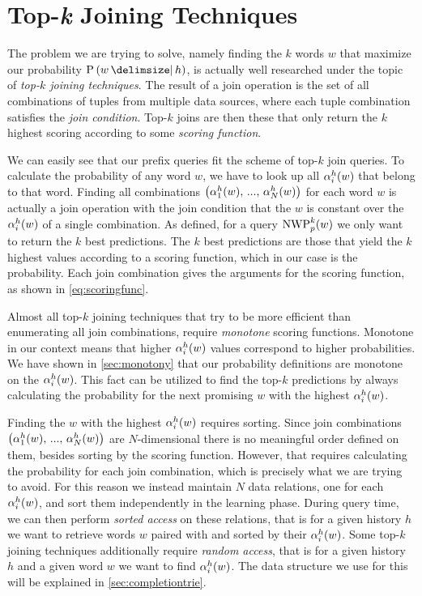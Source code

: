 \section{Top-\emph{k} Joining Techniques}
\label{sec:topkjoin}

The problem we are trying to solve, namely finding the $k$ words $w$ that
maximize our probability $\Prob{w}{h}$, is actually well researched under the
topic of \emph{top-$k$ joining techniques}.
The result of a join operation is the set of all combinations of tuples from
multiple data sources, where each tuple combination satisfies the \emph{join
condition}.
Top-$k$ joins are then these that only return the $k$ highest scoring
according to some \emph{scoring function}.

We can easily see that our prefix queries fit the scheme of top-$k$ join
queries.
To calculate the probability of any word $w$, we have to look up all
$\alpha^h_i(w)$ that belong to that word.
Finding all combinations
$\left(\alpha^h_1(w), \, ..., \, \alpha^h_N(w)\right)$
for each word $w$ is actually a join operation with the join condition that
the $w$ is constant over the $\alpha^h_i(w)$ of a single combination.
As defined, for a query $\NWP[p][k]{w}$ we only want to return the $k$ best
predictions.
The $k$ best predictions are those that yield the $k$ highest values according
to a scoring function, which in our case is the probability.
Each join combination gives the arguments for the scoring function, as shown
in \cref{eq:scoringfunc}.

Almost all top-$k$ joining techniques that try to be more efficient than
enumerating all join combinations, require \emph{monotone} scoring functions.
Monotone in our context means that higher $\alpha^h_i(w)$ values correspond
to higher probabilities.
We have shown in \cref{sec:monotony} that our probability definitions are
monotone on the $\alpha^h_i(w)$.
This fact can be utilized to find the top-$k$ predictions by always calculating
the probability for the next promising $w$ with the highest $\alpha^h_i(w)$.

Finding the $w$ with the highest $\alpha^h_i(w)$ requires sorting.
Since join combinations
$\left(\alpha^h_1(w), \, ..., \, \alpha^h_N(w)\right)$ are $N$-dimensional
there is no meaningful order defined on them, besides sorting by the scoring
function.
However, that requires calculating the probability for each join
combination, which is precisely what we are trying to avoid.
For this reason we instead maintain $N$ data relations, one for each
$\alpha^h_i(w)$, and sort them independently in the learning phase.
During query time, we can then perform \emph{sorted access} on these relations,
that is for a given history $h$ we want to retrieve words $w$ paired with and
sorted by their $\alpha^h_i(w)$.
Some top-$k$ joining techniques additionally require \emph{random access},
that is for a given history $h$ and a given word $w$ we want to find
$\alpha^h_i(w)$.
The data structure we use for this will be explained in
\cref{sec:completiontrie}.

